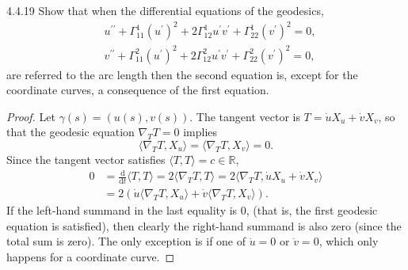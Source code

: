 \documentclass[11pt]{article}
\begin{document}
\begin{problem}{4.4.19}
  Show that when the differential equations of the geodesics,
  \begin{equation}
  \label{eq:geodesic}
  \begin{aligned}
    &u^{\prime\prime} + \Gamma^1_{11}(u^{\prime})^2 + 2 \Gamma^1_{12}u^{\prime}v^{\prime} + \Gamma^1_{22}(v^{\prime})^2 = 0, \\
    &v^{\prime\prime} + \Gamma^2_{11}(u^{\prime})^2 + 2 \Gamma^2_{12}u^{\prime}v^{\prime} + \Gamma^2_{22}(v^{\prime})^2 = 0,
  \end{aligned}
\end{equation}
are referred to the arc length then the second equation is, except for the coordinate curves, a consequence of the first equation.
\end{problem}
\begin{proof}
  Let \( \gamma(s) = (u(s), v(s)). \)
  The tangent vector is \( T = \dot{u}X_u + \dot{v}X_v \), so that the geodesic equation \( \nabla_T T = 0 \) implies
  \begin{equation}
    \label{eq:2}
    \langle \nabla_T T, X_u \rangle = \langle \nabla_T T, X_v \rangle = 0.
  \end{equation}
  Since the tangent vector satisfies \( \langle T, T \rangle = c \in \mathbb{R} \),
  \begin{equation}
  \label{eq:10}
  \begin{aligned}
    0 &= \frac{\mathrm{d} }{\mathrm{d} t}\langle T, T \rangle = 2 \langle \nabla_T T, T \rangle = 2 \langle \nabla_T T, \dot{u}X_u + \dot{v}X_v \rangle \\
    &= 2 \left( \dot{u}\langle \nabla_T T, X_u \rangle + \dot{v} \langle\nabla_T T, X_{v} \rangle \right).
  \end{aligned}
\end{equation}
If the left-hand summand in the last equality is \( 0 \), (that is, the first geodesic equation is satisfied), then clearly the right-hand summand is also zero (since the total sum is zero).
The only exception is if one of \( \dot{u} = 0 \) or \( \dot{v} = 0 \), which only happens for a coordinate curve.
\end{proof}
\end{document}
